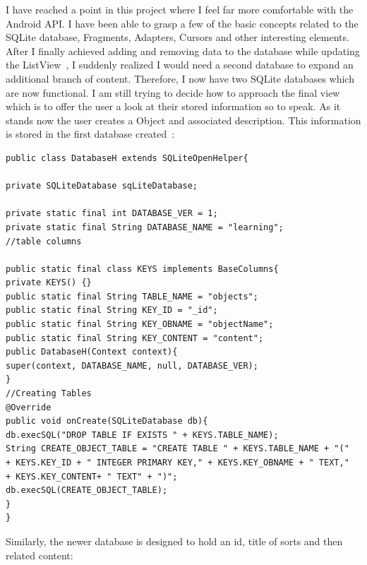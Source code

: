 \documentclass[fontsize=11pt, %
paper=a4, %
twoside, %
captions=tableheading,
index=totoc,
hyperref]{labbook}
\begin{document}

\labday{\today}

\begin{onehalfspace}
I have reached a point in this project where I feel far more comfortable with the Android API. I have been able to grasp a few of the basic concepts related to the SQLite database, Fragments, Adapters, Cursors and other interesting elements. After I finally achieved adding and removing data to the database while updating the ListView~\citep{listview}, I suddenly realized I would need a second database to expand an additional branch of content. Therefore, I now have two SQLite databases which are now functional. I am still trying to decide how to approach the final view which is to offer the user a look at their stored information so to speak. As it stands now the user creates a Object and associated description. This information is stored in the first database created~\citep{sqlite}:
\end{onehalfspace}
\begin{verbatim}
public class DatabaseH extends SQLiteOpenHelper{

private SQLiteDatabase sqLiteDatabase;

private static final int DATABASE_VER = 1;
private static final String DATABASE_NAME = "learning";
//table columns

public static final class KEYS implements BaseColumns{
private KEYS() {}
public static final String TABLE_NAME = "objects";
public static final String KEY_ID = "_id";
public static final String KEY_OBNAME = "objectName";
public static final String KEY_CONTENT = "content";
public DatabaseH(Context context){
super(context, DATABASE_NAME, null, DATABASE_VER);
}
//Creating Tables
@Override
public void onCreate(SQLiteDatabase db){
db.execSQL("DROP TABLE IF EXISTS " + KEYS.TABLE_NAME);
String CREATE_OBJECT_TABLE = "CREATE TABLE " + KEYS.TABLE_NAME + "("
+ KEYS.KEY_ID + " INTEGER PRIMARY KEY," + KEYS.KEY_OBNAME + " TEXT,"
+ KEYS.KEY_CONTENT+ " TEXT" + ")";
db.execSQL(CREATE_OBJECT_TABLE);
}
}
\end{verbatim}
\clearpage
\begin{onehalfspace}
Similarly, the newer database is designed to hold an id, title of sorts and then related content:
\end{onehalfspace}
\end{document}
